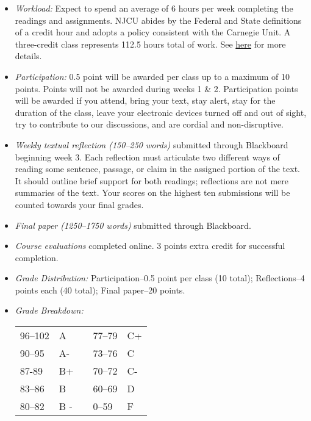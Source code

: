 \documentclass[article,oneside]{memoir}
\begin{document}
\begin{itemize}
\item \textit{Workload:} Expect to spend an average of 6 hours per week completing the readings and assignments. NJCU abides by the Federal and State definitions of a credit hour and adopts a policy consistent with the Carnegie Unit. A three-credit class represents 112.5 hours total of work. See \href{http://scottoconnor.org/resources/Credit.pdf}{here} for more details.

\item \textit{Participation:} 0.5 point will be awarded per class up to a maximum of 10 points. Points will not be awarded during weeks 1 \& 2. Participation points will be awarded if you attend, bring your text, stay alert, stay for the duration of the class, leave your electronic devices turned off and out of sight, try to contribute to our discussions, and are cordial and non-disruptive. 


\item \textit{Weekly textual reflection (150--250 words)} submitted through Blackboard beginning week 3. Each reflection must articulate two different ways of reading some sentence, passage, or claim in the assigned portion of the text. It should outline brief support for both readings; reflections are not mere summaries of the text. Your scores on the highest ten submissions will be counted towards your final grades. 



\item \textit{Final paper  (1250--1750 words) } submitted through Blackboard. 

\item \textit{Course evaluations} completed online. 3 points extra credit for successful completion.

\item \textit{Grade Distribution:} Participation--0.5 point per class (10 total); Reflections--4 points each (40 total); Final paper--20 points. 

\item \textit{Grade Breakdown:}

 \begin{tabular}{ | l | l | p{2cm} | l | l | }
    \hline 
96--102 & A  & &  77--79 &  C+ \\  
90--95 & A- & &  73--76 & C \\
87-89 & B+ &  &  70--72 & C- \\ 
83--86 & B  & &  60--69 & D\\
80--82 & B - & & 0--59 & F\\ \hline
    \end{tabular}


\end{itemize}
\end{document}
